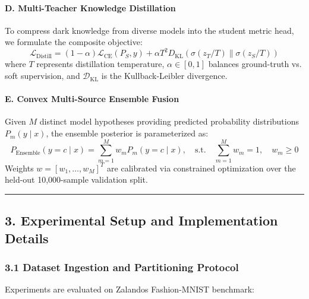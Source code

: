 \paragraph{D. Multi-Teacher Knowledge
Distillation}\label{d-multi-teacher-knowledge-distillation}

To compress dark knowledge from diverse models into the student metric
head, we formulate the composite objective:
\[\mathcal{L}_{\text{Distill}} = (1 - \alpha) \mathcal{L}_{\text{CE}}(P_S, y) + \alpha T^2 D_{\text{KL}}\left( \sigma(z_T / T) \parallel \sigma(z_S / T) \right)\]
where \(T\) represents distillation temperature, \(\alpha \in [0, 1]\)
balances ground-truth vs. soft supervision, and
\(\mathcal{D}_{\text{KL}}\) is the Kullback-Leibler divergence.

\paragraph{E. Convex Multi-Source Ensemble
Fusion}\label{e-convex-multi-source-ensemble-fusion}

Given \(M\) distinct model hypotheses providing predicted probability
distributions \(P_m(y \mid x)\), the ensemble posterior is parameterized
as:
\[P_{\text{Ensemble}}(y = c \mid x) = \sum_{m=1}^{M} w_m P_m(y = c \mid x), \quad \text{s.t.} \quad \sum_{m=1}^{M} w_m = 1, \quad w_m \ge 0\]
Weights \(w = [w_1, \dots, w_M]^T\) are calibrated via constrained
optimization over the held-out 10,000-sample validation split.

\begin{center}\rule{0.5\linewidth}{0.5pt}\end{center}

\subsection{3. Experimental Setup and Implementation
Details}\label{3-experimental-setup-and-implementation-details}

\subsubsection{3.1 Dataset Ingestion and Partitioning
Protocol}\label{31-dataset-ingestion-and-partitioning-protocol}

Experiments are evaluated on Zalando\textquotesingle s Fashion-MNIST
benchmark:


